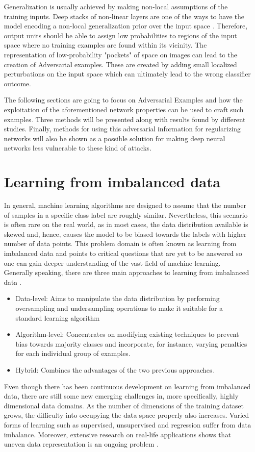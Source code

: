 Generalization is usually achieved by making non-local assumptions of the training inputs. Deep stacks of non-linear layers are one of the ways to have the model encoding a non-local generalization prior over the input space \cite{gu2014}. Therefore, output units should be able to assign low probabilities to regions of the input space where no training examples are found within its vicinity. The representation of low-probability "pockets" of space on images can lead to the creation of Adversarial examples. These are created by adding small localized perturbations on the input space which can ultimately lead to the wrong classifier outcome. 


The following sections are going to focus on Adversarial Examples and how the exploitation of the aforementioned network properties can be used to craft such examples. Three methods will be presented along with results found by different studies. Finally, methods for using this adversarial information for regularizing networks will also be shown as a possible solution for making deep neural networks less vulnerable to these kind of attacks.

\section{Learning from imbalanced data}
In general, machine learning algorithms are designed to assume that the number of samples in a specific class label are roughly similar. Nevertheless, this scenario is often rare on the real world, as in most cases, the data distribution available is skewed and, hence, causes the model to be biased towards the labels with higher number of data points. This problem domain is often known as learning from imbalanced data \cite{japkowicz2002class} and points to critical questions that are yet to be answered so one can gain deeper understanding of the vast field of machine learning. Generally speaking, there are three main approaches to learning from imbalanced data \cite{krawczyk2016learning}. 
\begin{itemize}
	\item Data-level: Aims to manipulate the data distribution by performing oversampling and undersampling operations to make it suitable for a standard learning algorithm
	\item Algorithm-level: Concentrates on modifying existing techniques to prevent bias towards majority classes and incorporate, for instance, varying penalties for each individual group of examples.
	\item Hybrid: Combines the advantages of the two previous approaches.
\end{itemize}

Even though there has been continuous development on learning from imbalanced data, there are still some new emerging challenges in, more specifically, highly dimensional data domains. As the number of dimensions of the training dataset grows, the difficulty into occupying the data space properly also increases. Varied forms of learning such as supervised, unsupervised and regression suffer from data imbalance. Moreover, extensive research on real-life applications shows that uneven data representation is an ongoing problem \cite{krawczyk2016learning}.
